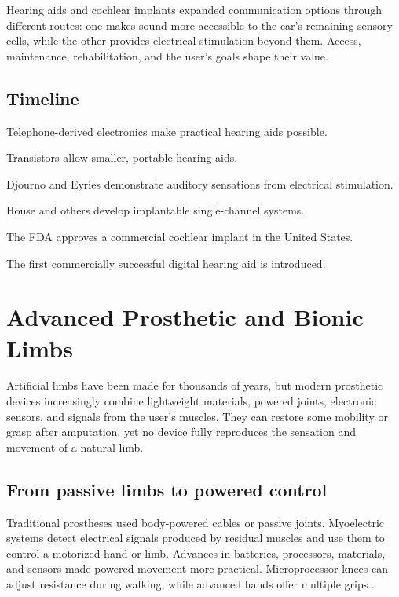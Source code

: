 \documentclass[12pt,oneside]{book}
\begin{document}
Hearing aids and cochlear implants expanded communication options through
different routes: one makes sound more accessible to the ear's remaining
sensory cells, while the other provides electrical stimulation beyond them.
Access, maintenance, rehabilitation, and the user's goals shape their value.

\section*{Timeline}
\begin{description}[leftmargin=2.3cm,style=nextline]
  \item[Early twentieth century] Telephone-derived electronics make practical hearing aids possible.
  \item[1950s] Transistors allow smaller, portable hearing aids.
  \item[1957] Djourno and Eyries demonstrate auditory sensations from electrical stimulation.
  \item[1960s--1970s] House and others develop implantable single-channel systems.
  \item[1984] The FDA approves a commercial cochlear implant in the United States.
  \item[1996] The first commercially successful digital hearing aid is introduced.
\end{description}
\chapter[Advanced Prosthetic and Bionic Limbs]{Advanced Prosthetic and Bionic Limbs}

Artificial limbs have been made for thousands of years, but modern prosthetic
devices increasingly combine lightweight materials, powered joints,
electronic sensors, and signals from the user's muscles. They can restore
some mobility or grasp after amputation, yet no device fully reproduces the
sensation and movement of a natural limb.

\section{From passive limbs to powered control}
Traditional prostheses used body-powered cables or passive joints. Myoelectric
systems detect electrical signals produced by residual muscles and use them
to control a motorized hand or limb. Advances in batteries, processors,
materials, and sensors made powered movement more practical. Microprocessor
knees can adjust resistance during walking, while advanced hands offer
multiple grips \cite{prostheticsHistory,prostheticHandReview}.
\end{document}
